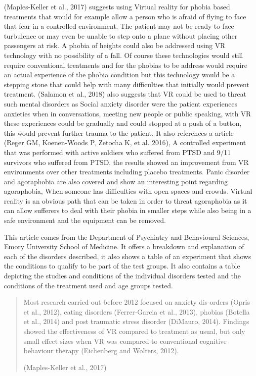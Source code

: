 \documentclass[10pt,journal,compsoc]{IEEEtran}
\begin{document}
	 (Maples-Keller et al., 2017) suggests using Virtual reality for phobia based treatments that would for example allow a person who is afraid of flying to face that fear in a controlled environment. The patient may not be ready to face turbulence or may even be unable to step onto a plane without placing other passengers at risk. A phobia of heights could also be addressed using VR technology with no possibility of a fall. Of course these technologies would still require conventional treatments and for the phobias to be address would require an actual experience of the phobia condition but this technology would be a stepping stone that could help with many difficulties that initially would prevent treatment. (Salamon et al., 2018) also suggests that VR could be used to threat such mental disorders as Social anxiety disorder were the patient experiences anxieties when in conversations, meeting new people or public speaking, with VR these experiences could be  gradually and could stopped at a push of a button, this would prevent further trauma to the patient. It also references a article (Reger GM, Koenen-Woods P, Zetocha K, et al. 2016), A controlled experiment that was performed with active soldiers who suffered from PTSD and 9/11 survivors who suffered from PTSD, the results showed an improvement from VR environments over other treatments including placebo treatments. Panic disorder and agoraphobia are also covered and show an interesting point regarding agoraphobia, When someone has difficulties with open spaces and crowds. Virtual reality is an obvious path that can be taken in order to threat agoraphobia as it can allow sufferers to deal with their phobia in smaller steps while also being in a safe environment and the equipment can be removed. \newline
	 
	 This article comes from the Department of Psychiatry and Behavioural Sciences, Emory University School of Medicine. It offers a breakdown and explanation of each of the disorders described, it also shows a table of an experiment that shows the conditions to qualify to be part of the test groups. It also contains a table depicting the studies and conditions of the individual disorders tested and the conditions of the treatment used and age groups tested. \newline

	\begin{quotation}
		 Most research carried out before 2012 focused on anxiety dis-orders (Opris et al., 2012), eating disorders (Ferrer-Garcia et al., 2013), phobias (Botella et al., 2014) and post traumatic stress disorder (DiMauro, 2014). Findings showed the effectiveness of VR compared to treatment as usual, but only small effect sizes when VR was compared to conventional cognitive behaviour therapy (Eichenberg and Wolters, 2012).\newline 
		 
		 (Maples-Keller et al., 2017)
	\end{quotation}
\end{document}
